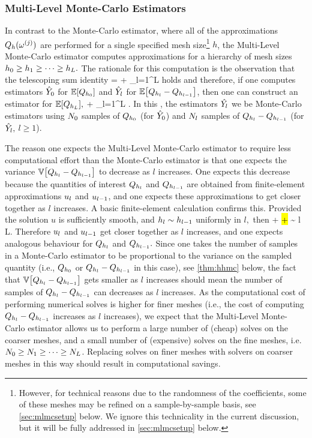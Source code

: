 \subsubsection{Multi-Level Monte-Carlo Estimators}

In contrast to the Monte-Carlo estimator, where all of the approximations $Q_{h}(\omega^{(j)})$ are performed for a single specified mesh size\footnote{However, for technical reasons due to the randomness of the coefficients, some of these meshes may be refined on a sample-by-sample basis, see \cref{sec:mlmcsetup} below. We ignore this technicality in the current discussion, but it will be fully addressed in \cref{sec:mlmcsetup} below.} $h$, the Multi-Level Monte-Carlo estimator computes approximations for a hierarchy of mesh sizes $h_{0} \geq h_{1} \geq \cdots \geq h_{L}.$ The rationale for this computation is the observation that the telescoping sum identity
\beq\label{eq:mlmctelescope}
\EXP{\uhL} = \EXP{\uhz} + \sum_{l=1}^L \EXP{\uhl-\uhlmo}
\eeq
holds and therefore, if one computes estimators $\hat{Y}_{0}$ for $\EXP{\Qhz}$ and $\hat{Y}_{l}$ for $\EXP{\Qhl - \Qhlmo}$, then one can construct an estimator for $\EXP{\QhL},$ 
\beqs
\QhatMLhL \de \Yzhat + \sum_{l=1}^L \Ylhat.
\eeqs
In this , the estimators $\hat{Y_{l}}$ we be Monte-Carlo estimators using $N_{0}$ samples of $Q_{h_{0}}$ (for $\hat{Y}_{0}$) and $N_{l}$ samples of $Q_{h_{l}}-Q_{h_{l-1}}$ (for $\hat{Y}_{l},$ $l \geq 1$).

The reason one expects the Multi-Level Monte-Carlo estimator to require less computational effort than the Monte-Carlo estimator is that one expects the variance $\VAR{\Qhl-\Qhlmo}$ to decrease as $l$ increases. One expects this decrease because the quantities of interest $Q_{h_{l}}$ and $Q_{h_{l-1}}$ are obtained from finite-element approximations $u_{l}$ and $u_{l-1}$, and one expects these approximations to get closer together as $l$ increases. A basic finite-element calculation confirms this. Provided the solution $u$ is sufficiently smooth, and $h_{l} \sim h_{l-1}$ uniformly in $l,$ then
\beqs
\NHo{\uhl - \uhlmo} \leq {} +  \lesssim \hl + \hlmo \sim \hlmo {}  l \rightarrow L.
\eeqs
Therefore $u_{l}$ and $u_{l-1}$ get closer together as $l$ increases, and one expects analogous behaviour for $Q_{h_{l}}$ and $Q_{h_{l-1}}.$ Since one takes the number of samples in a Monte-Carlo estimator to be proportional to the variance on the sampled quantity (i.e., $Q_{h_{0}}$ or $Q_{h_{l}}-Q_{h_{l-1}}$ in this case), see \cref{thm:hhmc} below, the fact that $\VAR{\Qhl-\Qhlmo}$ gets smaller as $l$ increases should mean the number of samples of $Q_{h_{l}}-Q_{h_{l-1}}$ can decreases as $l$ increases. As the computational cost of performing numerical solves is higher for finer meshes (i.e., the cost of computing $Q_{h_{l}}-Q_{h_{l-1}}$ increases as $l$ increases), we expect that the Multi-Level Monte-Carlo estimator allows us to perform a large number of (cheap) solves on the coarser meshes, and a small number of (expensive) solves on the fine meshes, i.e. $N_{0} \geq N_{1} \geq \cdots \geq N_{L}$. Replacing solves on finer meshes with solvers on coarser meshes in this way should result in computational savings.

